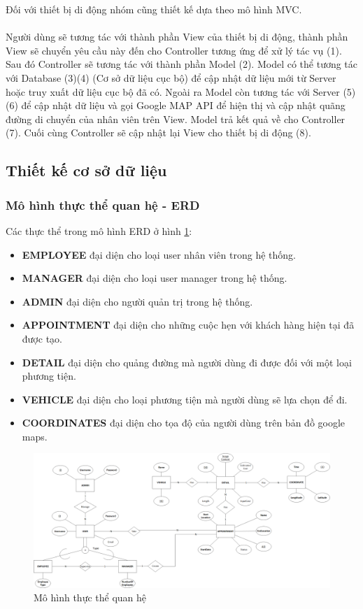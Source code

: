 \documentclass[a4paper]{article}
\begin{document}
\clearpage
\noindent
Đối với thiết bị di động nhóm cũng thiết kế dựa theo mô hình MVC.\\
\\
Người dùng sẽ tương tác với thành phần View của thiết bị di động, thành phần View sẽ chuyển yêu cầu này đến cho Controller tương ứng để xử lý tác vụ (1). Sau đó Controller sẽ tương tác với thành phần Model (2). Model có thể tương tác với Database (3)(4) (Cơ sở dữ liệu cục bộ) để cập nhật dữ liệu mới từ Server hoặc truy xuất dữ liệu cục bộ đã có. Ngoài ra Model còn tương tác với Server (5)(6) để cập nhật dữ liệu và gọi Google MAP API để hiện thị và cập nhật quãng đường di chuyển của nhân viên trên View. Model trả kết quả về cho Controller (7). Cuối cùng Controller sẽ cập nhật lại View cho thiết bị di động (8).
\subsection{Thiết kế cơ sở dữ liệu}
\subsubsection{Mô hình thực thể quan hệ - ERD}
Các thực thể trong mô hình ERD ở hình \ref{fig:erd}:
\begin{itemize}
    \item \textbf{EMPLOYEE} đại diện cho loại user nhân viên trong hệ thống. 
\item \textbf{MANAGER} đại diện cho loại user manager trong hệ thống.
\item \textbf{ADMIN} đại diện cho người quản trị trong hệ thống.
\item \textbf{APPOINTMENT} đại diện cho những cuộc hẹn với khách hàng hiện tại đã được tạo.
\item \textbf{DETAIL} đại diện cho quảng đường mà người dùng đi được đối với một loại phương tiện.
\item \textbf{VEHICLE} đại diện cho loại phương tiện mà người dùng sẽ lựa chọn để đi.
\item \textbf{COORDINATES} đại diện cho tọa độ của người dùng trên bản đồ google maps.
\end{itemize}
\begin{figure}
    \includegraphics[width=21cm]{erd}
    \caption{Mô hình thực thể quan hệ}
    \label{fig:erd}
\end{figure}
\end{document}
